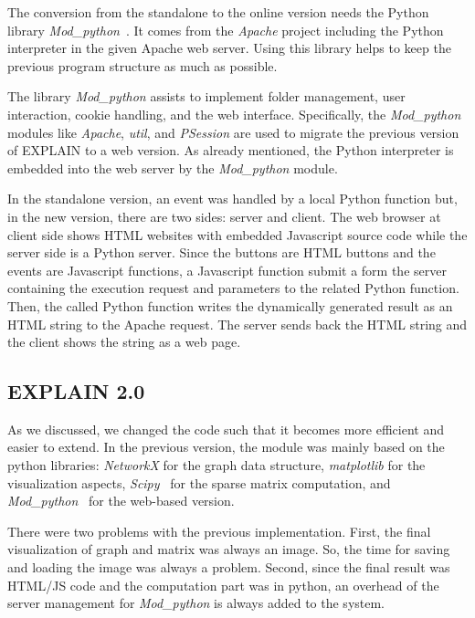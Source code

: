 \documentclass[12pt, twoside,a4paper,toc=bibliography]{scrbook}
\begin{document}
The conversion from the standalone to the online version needs the Python library \textit{Mod\_python}~\cite{modpython2013}. It comes from the \textit{Apache} project including the Python interpreter in the given Apache web server. Using this library helps to keep the previous program structure as much as possible.

The library \textit{Mod\_python} assists to implement folder management, user interaction, cookie handling, and the web interface. Specifically, the \textit{Mod\_python} modules like \textit{Apache}, \textit{util}, and \textit{PSession} are used to migrate the previous version of \mbox{EXPLAIN} to a web version. As already mentioned, the Python interpreter is embedded into the web server by the \textit{Mod\_python} module.

In the standalone version, an event was handled by a local Python function but, in the new version, there are two sides: server and client. The web browser at client side shows HTML websites with embedded Javascript source code while the server side is a Python server. Since the buttons are HTML buttons and the events are Javascript functions, a Javascript function submit a form the server containing the execution request and parameters to the related Python function. Then, the called Python function writes the dynamically generated result as an HTML string to the Apache request. The server sends back the HTML string and the client shows the string as a web page.

\subsection{EXPLAIN 2.0}
\label{s.impl.explain2}
As we discussed, we changed the code such that it becomes more efficient and easier to extend.
In the previous version, the module was mainly based on the python libraries:
\textit{NetworkX} \cite{networkx2008} for the graph data structure,
\textit{matplotlib} \cite{matplotlib2007} for the visualization aspects,
\textit{Scipy}~\cite{scipy2001} for the sparse matrix computation, and
\textit{Mod\_python}~\cite{modpython2013} for the web-based version.

There were two problems with the previous implementation. First, the final visualization
of graph and matrix was always an image.
So, the time for saving and loading the image was always a problem.
Second, since the final result was HTML/JS code and the computation part was in python,
an overhead of the server management for \textit{Mod\_python} is always added to the system.
\end{document}
